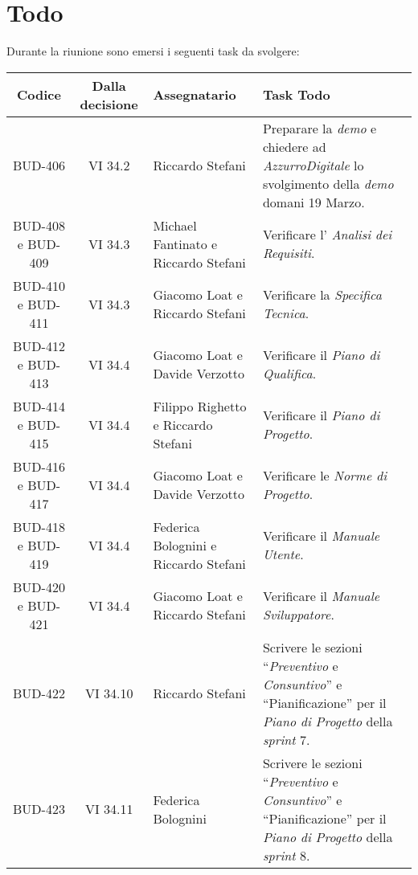 
\section{Todo}

Durante la riunione sono emersi i seguenti task da svolgere:

\vspace{0.5cm}

\begin{table}[htbp]
\centering
{}
\begin{tabular}{|c|c|p{}|p{}|}
    \hline
    \rowcolor[gray]{0.75}
    \textbf{Codice} & \textbf{Dalla decisione} & \textbf{Assegnatario} & \textbf{Task Todo} \\
    \hline
    BUD-406 & VI 34.2 & Riccardo Stefani & Preparare la \emph{demo} e chiedere ad \emph{AzzurroDigitale} lo svolgimento della \emph{demo} domani 19 Marzo.\\
    \hline
    BUD-408 e BUD-409 & VI 34.3 & Michael Fantinato e Riccardo Stefani & Verificare l' \emph{Analisi dei Requisiti}.\\
    \hline
    BUD-410 e BUD-411 & VI 34.3 & Giacomo Loat e Riccardo Stefani & Verificare la \emph{Specifica Tecnica}. \\
    \hline 
    BUD-412 e BUD-413 & VI 34.4 & Giacomo Loat e Davide Verzotto & Verificare il \emph{Piano di Qualifica}. \\
    \hline
    BUD-414 e BUD-415 & VI 34.4 & Filippo Righetto e Riccardo Stefani & Verificare il \emph{Piano di Progetto}. \\
    \hline
    BUD-416 e BUD-417 & VI 34.4 & Giacomo Loat e Davide Verzotto & Verificare le \emph{Norme di Progetto}. \\
    \hline
    BUD-418 e BUD-419 & VI 34.4 & Federica Bolognini e Riccardo Stefani & Verificare il \emph{Manuale Utente}. \\
    \hline
    BUD-420 e BUD-421 & VI 34.4 & Giacomo Loat e Riccardo Stefani & Verificare il \emph{Manuale Sviluppatore}. \\
    \hline
    BUD-422 & VI 34.10 & Riccardo Stefani & Scrivere le sezioni “\emph{Preventivo} e \emph{Consuntivo}” e “Pianificazione” per il \emph{Piano di Progetto} della \emph{sprint} 7.\\
    \hline
    BUD-423 & VI 34.11 & Federica Bolognini & Scrivere le sezioni “\emph{Preventivo} e \emph{Consuntivo}” e “Pianificazione” per il \emph{Piano di Progetto} della \emph{sprint} 8.\\

\end{tabular}
\end{table}
